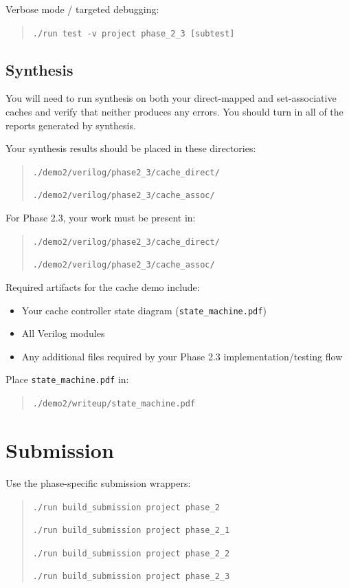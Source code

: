\documentclass[12pt]{article}
\begin{document}
Verbose mode / targeted debugging:
\begin{quote}
\texttt{./run test -v project phase\_2\_3 [subtest]}
\end{quote}

\subsection*{Synthesis}
You will need to run synthesis on both your direct-mapped and set-associative caches and verify that neither produces any errors. You should turn in all of the reports generated by synthesis.

Your synthesis results should be placed in these directories:
\begin{quote}
\texttt{./demo2/verilog/phase2\_3/cache\_direct/}

\texttt{./demo2/verilog/phase2\_3/cache\_assoc/}
\end{quote}

For Phase 2.3, your work must be present in:
\begin{quote}
\texttt{./demo2/verilog/phase2\_3/cache\_direct/}

\texttt{./demo2/verilog/phase2\_3/cache\_assoc/}
\end{quote}

Required artifacts for the cache demo include:

\begin{itemize}
\item Your cache controller state diagram (\texttt{state\_machine.pdf})
\item All Verilog modules
\item Any additional files required by your Phase 2.3 implementation/testing flow
\end{itemize}

Place \texttt{state\_machine.pdf} in:
\begin{quote}
\texttt{./demo2/writeup/state\_machine.pdf}
\end{quote}

\section*{Submission}

Use the phase-specific submission wrappers:
\begin{quote}
\texttt{./run build\_submission project phase\_2}

\texttt{./run build\_submission project phase\_2\_1}

\texttt{./run build\_submission project phase\_2\_2}

\texttt{./run build\_submission project phase\_2\_3}
\end{quote}
\end{document}
